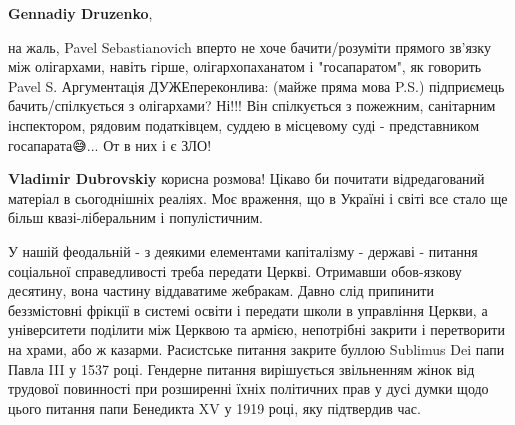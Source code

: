 \begin{itemize}
\begin{itemize}
 
\textbf{Gennadiy Druzenko}, 

на жаль, Pavel Sebastianovich вперто не хоче бачити/розуміти прямого зв'язку
між олігархами, навіть гірше, олігархопаханатом і "госапаратом", як говорить
Pavel S. Аргументація ДУЖЕ\Laughey[1.0][white] переконлива: (майже пряма мова P.S.) підприємець
бачить/спілкується з олігархами? Ні!!! Він спілкується з пожежним, санітарним
інспектором, рядовим податківцем, суддею в місцевому суді - представником
госапарата😅... От в них і є ЗЛО!

 
\textbf{Vladimir Dubrovskiy} корисна розмова! Цікаво би почитати відредагований
матеріал в сьогоднішніх реаліях. Моє враження, що в Україні і світі все стало
ще більш квазі-ліберальним і популістичним.



\end{itemize}

 

У нашій феодальній - з деякими елементами капіталізму - державі - питання
соціальної справедливості треба передати Церкві. Отримавши обов-язкову
десятину, вона частину віддаватиме жебракам. Давно слід припинити беззмістовні
фрікції в системі освіти і передати школи в управління Церкви, а університети
поділити між Церквою та армією, непотрібні закрити і перетворити на храми, або
ж казарми. Расистське питання закрите буллою Sublimus Dei папи Павла III у 1537
році. Гендерне питання вирішується звільненням жінок від трудової повинності
при розширенні їхніх політичних прав у дусі думки щодо цього питання папи
Бенедикта XV у 1919 році, яку підтвердив час.


 


\end{itemize}
